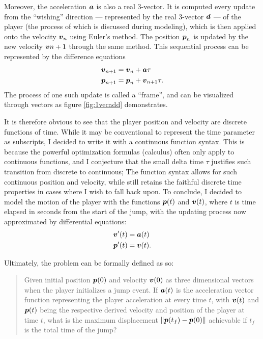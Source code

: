 Moreover, the acceleration $\boldsymbol{a}$ is also a real 3-vector. It is computed every update from the ``wishing'' direction --- represented by the real 3-vector $\boldsymbol{d}$ --- of the player (the process of which is discussed during modeling), which is then applied onto the velocity $\boldsymbol{v}_n$ using Euler's method. The position $\boldsymbol{p}_n$ is updated by the new velocity $\boldsymbol{v}{n+1}$ through the same method. This sequential process can be represented by the difference equations
\begin{align}
    \boldsymbol{v}_{n+1} &= \boldsymbol{v}_n + \boldsymbol{a} \tau\\
    \boldsymbol{p}_{n+1} &= \boldsymbol{p}_n + \boldsymbol{v}_{n+1} \tau.
\end{align}
The process of one such update is called a ``frame'', and can be visualized through vectors as figure \ref{fig:1vecadd} demonstrates.

It is therefore obvious to see that the player position and velocity are discrete functions of time. While it may be conventional to represent the time parameter as subscripts, I decided to write it with a continuous function syntax. This is because the powerful optimization formulas (calculus) often only apply to continuous functions, and I conjecture that the small delta time $\tau$ justifies such transition from discrete to continuous; The function syntax allows for such continuous position and velocity, while still retains the faithful discrete time properties in cases where I wish to fall back upon. To conclude, I decided to model the motion of the player with the functions $\boldsymbol{p}(t)$ and $\boldsymbol{v}(t)$, where $t$ is time elapsed in seconds from the start of the jump, with the updating process now approximated by differential equations:
\begin{align}
    \boldsymbol{v}'(t) &= \boldsymbol{a}(t) \label{eq:1de1}\\
    \boldsymbol{p}'(t) &= \boldsymbol{v}(t) \label{eq:1de2}.
\end{align}

Ultimately, the problem can be formally defined as so:
\begin{quote}
    Given initial position $\boldsymbol{p}(0)$ and velocity $\boldsymbol{v}(0)$ as three dimensional vectors when the player initializes a jump event. If $\boldsymbol{a}(t)$ is the acceleration vector function representing the player acceleration at every time $t$, with $\boldsymbol{v}(t)$ and $\boldsymbol{p}(t)$ being the respective derived velocity and position of the player at time $t$, what is the maximum displacement $\|\boldsymbol{p}(t_f) - \boldsymbol{p}(0)\|$ achievable if $t_f$ is the total time of the jump?
\end{quote}

